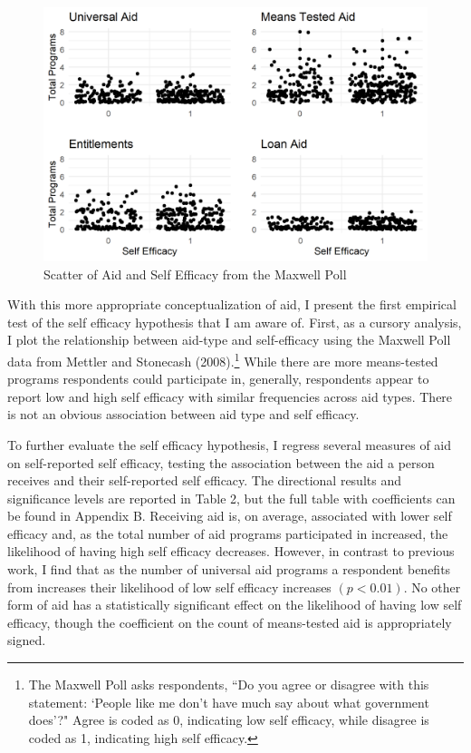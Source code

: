 \documentclass[12pt]{paper}
\begin{document}
\begin{figure} \centering
	\includegraphics[width=.8\linewidth]{Figs/scatter_SE.png}
	\caption{Scatter of Aid and Self Efficacy from the Maxwell Poll}
	\label{}
\end{figure}

With this more appropriate conceptualization of aid, I present the first empirical test of the self efficacy hypothesis that I am aware of. First, as a cursory analysis, I plot the relationship between aid-type and self-efficacy using the Maxwell Poll data from Mettler and Stonecash (2008).\footnote{The Maxwell Poll asks respondents, ``Do you agree or disagree with this statement: `People like me don’t have much say about what government does'?" Agree is coded as 0, indicating low self efficacy, while disagree is coded as 1, indicating high self efficacy.} While there are more means-tested programs respondents could participate in, generally, respondents appear to report low and high self efficacy with similar frequencies across aid types. There is not an obvious association between aid type and self efficacy.

To further evaluate the self efficacy hypothesis, I regress several measures of aid on self-reported self efficacy, testing the association between the aid a person receives and their self-reported self efficacy. The directional results and significance levels are reported in Table 2, but the full table with coefficients can be found in Appendix B. Receiving aid is, on average, associated with lower self efficacy and, as the total number of aid programs participated in increased, the likelihood of having high self efficacy decreases. However, in contrast to previous work, I find that as the number of universal aid programs a respondent benefits from increases their likelihood of low self efficacy increases $(p < 0.01)$. No other form of aid has a statistically significant effect on the likelihood of having low self efficacy, though the coefficient on the count of means-tested aid is appropriately signed. 
\end{document}
